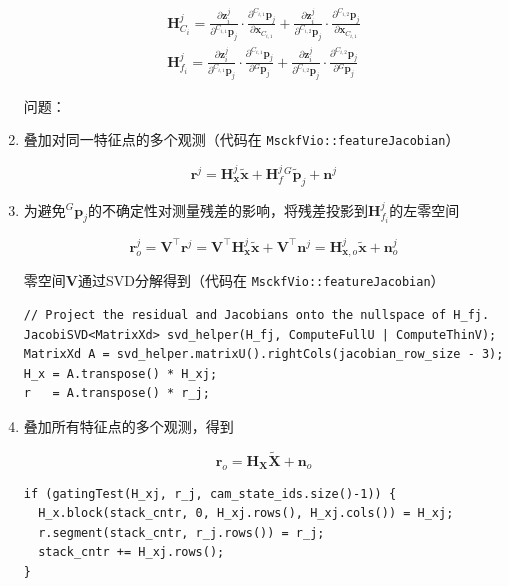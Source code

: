 \documentclass[12pt,a4paper]{article}
\begin{document}
\begin{enumerate}
\begin{equation}
\begin{gathered}
\mathbf{H}_{C_i}^j = 
\frac{\partial \mathbf{z}_i^j}{\partial {}^{C_{i,1}}\mathbf{p}_j} \cdot 
\frac{\partial {}^{C_{i,1}}\mathbf{p}_j}{\partial \mathbf{x}_{C_{i,1}}} + 
\frac{\partial \mathbf{z}_i^j}{\partial {}^{C_{i,2}}\mathbf{p}_j} \cdot 
\frac{\partial {}^{C_{i,2}}\mathbf{p}_j}{\partial \mathbf{x}_{C_{i,1}}} \\
\mathbf{H}_{f_i}^j = 
\frac{\partial \mathbf{z}_i^j}{\partial {}^{C_{i,1}}\mathbf{p}_j} \cdot 
\frac{\partial {}^{C_{i,1}}\mathbf{p}_j}{\partial {}^G\mathbf{p}_j} +
\frac{\partial \mathbf{z}_i^j}{\partial {}^{C_{i,2}}\mathbf{p}_j} \cdot 
\frac{\partial {}^{C_{i,2}}\mathbf{p}_j}{\partial {}^G\mathbf{p}_j} 
\end{gathered}
\end{equation}

问题：{\color{red}{Modifty the measurement Jacobian to ensure observability constrain}}

\item 叠加对同一特征点的多个观测（代码在 \verb|MsckfVio::featureJacobian|）

\begin{equation*}
\mathbf{r}^j = 
\mathbf{H}_{\mathbf{x}}^j\tilde{\mathbf{x}} + 
\mathbf{H}_f^j {}^G\tilde{\mathbf{p}}_j + 
\mathbf{n}^j
\end{equation*}


\item 为避免${}^G\mathbf{p}_j$的不确定性对测量残差的影响，将残差投影到$\mathbf{H}_{f_i}^j$的左零空间

\begin{equation}
\mathbf{r}^j_o 
= \mathbf{V}^\top \mathbf{r}^j
= \mathbf{V}^\top \mathbf{H}_{\mathbf{x}}^j\tilde{\mathbf{x}} +
\mathbf{V}^\top \mathbf{n}^j
= \mathbf{H}_{\mathbf{x}, o}^j\tilde{\mathbf{x}} + 
\mathbf{n}^j_o
\end{equation}

零空间$\mathbf{V}$通过SVD分解得到（代码在 \verb|MsckfVio::featureJacobian|）
\begin{lstlisting}
// Project the residual and Jacobians onto the nullspace of H_fj.
JacobiSVD<MatrixXd> svd_helper(H_fj, ComputeFullU | ComputeThinV);
MatrixXd A = svd_helper.matrixU().rightCols(jacobian_row_size - 3);
H_x = A.transpose() * H_xj;
r   = A.transpose() * r_j;
\end{lstlisting}

\item 叠加所有特征点的多个观测，得到

\begin{equation}
\label{equ:visual_residual_final}
\mathbf{r}_{o}=\mathbf{H}_{\mathbf{X}} \widetilde{\mathbf{X}}+\mathbf{n}_{o}
\end{equation}

\begin{lstlisting}
if (gatingTest(H_xj, r_j, cam_state_ids.size()-1)) {
  H_x.block(stack_cntr, 0, H_xj.rows(), H_xj.cols()) = H_xj;
  r.segment(stack_cntr, r_j.rows()) = r_j;
  stack_cntr += H_xj.rows();
}
\end{lstlisting}

\end{enumerate}
\end{document}

